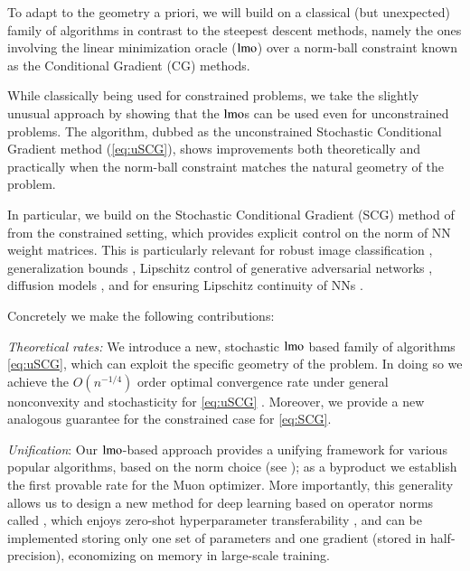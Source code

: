 To adapt to the geometry a priori, we will build on a classical (but unexpected) family of algorithms in contrast to the steepest descent methods, namely the ones involving the linear minimization oracle ($\operatorname{lmo}$) over a norm-ball constraint known as the Conditional Gradient (CG) methods.

 While classically being used for constrained problems, we take the slightly unusual approach by showing that the $\operatorname{lmo}$s can be used even for unconstrained problems.
The algorithm, dubbed as the unconstrained Stochastic Conditional Gradient method (\ref{eq:uSCG}), shows improvements both theoretically and practically when the norm-ball constraint matches the natural geometry of the problem.%

In particular, we build on the Stochastic Conditional Gradient (SCG) method of \citet{mokhtari2020stochastic} from the constrained setting, which provides explicit control on the norm of NN weight matrices. This is particularly relevant for robust image classification \citep{cisse2017parseval}, generalization bounds \citep{GenBound17}, Lipschitz control of generative adversarial networks \citep{arjovsky2017wasserstein,miyato2018spectral}, diffusion models \citep[Sec. 2.3]{karras2024analyzing}, and for ensuring Lipschitz continuity of NNs \citep{large2024scalable}.



Concretely we make the following contributions:

\emph{Theoretical rates:} 
    We introduce a new, stochastic $\operatorname{lmo}$ based family of algorithms \ref{eq:uSCG}, which can exploit the specific geometry of the problem.
    In doing so we achieve the $O(n^{-1/4})$ order optimal convergence rate under general nonconvexity and stochasticity for \ref{eq:uSCG} \citep{arjevani2022lowerboundsnonconvexstochastic}.
    Moreover, we provide a new analogous guarantee for the constrained case for \ref{eq:SCG}.
    
    \emph{Unification}: 
    Our $\operatorname{lmo}$-based approach provides a unifying framework for various popular algorithms, based on the norm choice (see ); as a byproduct we establish the first provable rate for the Muon optimizer. 
    More importantly, this generality allows us to design a new method for deep learning based on operator norms called \Scion, which enjoys zero-shot hyperparameter transferability \citep{yang2022tensor},
    and {can be implemented storing only one set of parameters and one gradient (stored in half-precision), economizing on memory in large-scale training}.

